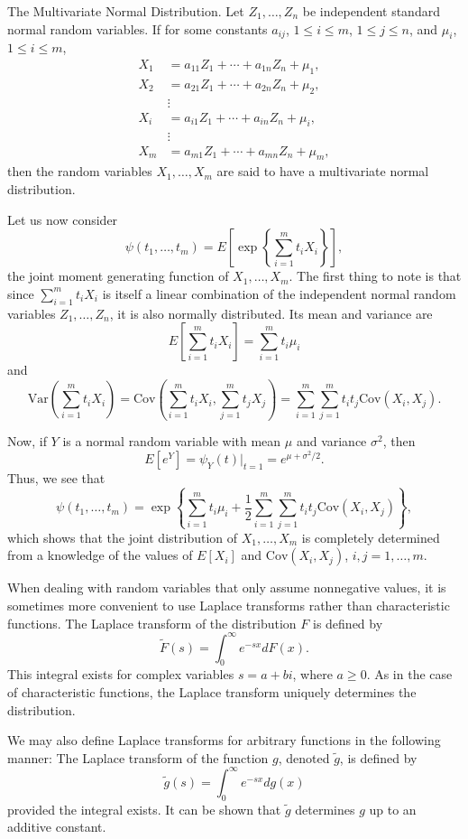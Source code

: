 \documentclass[lang=cn,10pt]{elegantbook}
\begin{document}
\begin{example}
	The Multivariate Normal Distribution. Let \(Z_1, \ldots, Z_n\) be independent standard normal random variables. If for some constants \(a_{ij}\), \(1 \leq i \leq m\), \(1 \leq j \leq n\), and \(\mu_i\), \(1 \leq i \leq m\),
\begin{align*}
X_1 &= a_{11} Z_1 + \cdots + a_{1n} Z_n + \mu_1, \\
X_2 &= a_{21} Z_1 + \cdots + a_{2n} Z_n + \mu_2, \\
&\vdots \\
X_i &= a_{i1} Z_1 + \cdots + a_{in} Z_n + \mu_i, \\
&\vdots \\
X_m &= a_{m1} Z_1 + \cdots + a_{mn} Z_n + \mu_m,
\end{align*}
then the random variables \(X_1, \ldots, X_m\) are said to have a multivariate normal distribution.

Let us now consider
\[
\psi(t_1, \ldots, t_m) = E\left[\exp\left\{\sum_{i=1}^m t_i X_i\right\}\right],
\]
the joint moment generating function of \(X_1, \ldots, X_m\). The first thing to note is that since \(\sum_{i=1}^m t_i X_i\) is itself a linear combination of the independent normal random variables \(Z_1, \ldots, Z_n\), it is also normally distributed. Its mean and variance are
\[
E\left[\sum_{i=1}^m t_i X_i\right] = \sum_{i=1}^m t_i \mu_i
\]
and
\[
\text{Var}\left(\sum_{i=1}^m t_i X_i\right) = \text{Cov}\left(\sum_{i=1}^m t_i X_i, \sum_{j=1}^m t_j X_j\right) = \sum_{i=1}^m \sum_{j=1}^m t_i t_j \text{Cov}(X_i, X_j).
\]

Now, if \(Y\) is a normal random variable with mean \(\mu\) and variance \(\sigma^2\), then
\[
E[e^{Y}] = \psi_Y(t)|_{t=1} = e^{\mu + \sigma^2/2}.
\]
Thus, we see that
\[
\psi(t_1, \ldots, t_m) = \exp\left\{\sum_{i=1}^m t_i \mu_i + \frac{1}{2} \sum_{i=1}^m \sum_{j=1}^m t_i t_j \text{Cov}(X_i, X_j)\right\},
\]
which shows that the joint distribution of \(X_1, \ldots, X_m\) is completely determined from a knowledge of the values of \(E[X_i]\) and \(\text{Cov}(X_i, X_j)\), \(i, j = 1, \ldots, m\).

When dealing with random variables that only assume nonnegative values, it is sometimes more convenient to use Laplace transforms rather than characteristic functions. The Laplace transform of the distribution \(F\) is defined by
\[
\tilde{F}(s) = \int_0^\infty e^{-sx} dF(x).
\]
This integral exists for complex variables \(s = a + bi\), where \(a \geq 0\). As in the case of characteristic functions, the Laplace transform uniquely determines the distribution.

We may also define Laplace transforms for arbitrary functions in the following manner: The Laplace transform of the function \(g\), denoted \(\tilde{g}\), is defined by
\[
\tilde{g}(s) = \int_0^\infty e^{-sx} dg(x)
\]
provided the integral exists. It can be shown that \(\tilde{g}\) determines \(g\) up to an additive constant.
\end{example}
\end{document}
